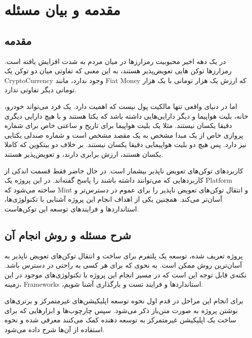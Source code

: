 
\chapter{مقدمه و بیان مسئله}

\section{مقدمه}
در یک دهه اخیر محبوبیت رمزارز‌ها در میان مردم به شدت افزایش یافته است.
رمزارزها توکن هایی تعویض‌پذیر هستند، به این معنی که تفاوتی میان دو توکن یک
\gls{CryptoCurrency}
وجود ندارد، مانند
\gls{Fiat Money}
که ارزش یک هزار تومانی با یک هزار تومانی دیگر تفاوتی ندارد.

اما در دنیای واقعی تنها مالکیت پول نیست که اهمیت دارد.
یک فرد می‌تواند خودرو، خانه، بلیت هواپیما و دیگر دارایی‌هایی داشته باشد که یکتا هستند و
با هیچ دارایی دیگری دقیقا یکسان نیستند.
مثلا یک بلیت هواپیما برای تاریخ و ساعتی خاص برای شماره پروازی خاص از یک مبدا مشخص به یک مقصد مشخص است و
شماره صندلی یکتایی نیز دارد.
پس هیچ دو بلیت هواپیمایی دقیقا یکسان نیستند.
بر خلاف دو بیتکوین که کاملا یکسان هستند، ارزش برابری دارند، و تعویض‌پذیر هستند.

کاربردهای توکن‌های تعویض ناپذیر بیشمار است.
در حال حاضر فقط قسمت اندکی از کاربردهایی که می‌توانند داشته باشند را پاسخ گفته‌اند.
در این پروژه یک
\gls{Platform}
ساخته می‌شود که
\gls{Mint}
و انتقال توکن‌های تعویض ناپذیر را برای عموم در دسترس‌تر و آسان‌تر می‌کند.
همچنین یکی از اهداف انجام این پروژه آشنایی با تکنولوژی‌ها، استاندارد‌ها و فرایند‌های توسعه این توکن‌هاست.


\section{شرح مسئله و روش انجام آن}
پروژه تعریف شده،
توسعه یک پلتفرم برای ساخت و انتقال توکن‌های تعویض ناپذیر به آسان‌ترین روش ممکن است.
به نحوی که برای هر کسی به راحتی در دسترس باشد.
نکته‌ی قابل توجه‌ این است که در مسیر انجام این پروژه با تکنولوژی‌های موجود در این زمینه، 
\glspl{Framework}
،استاندارد‌ها و فرایند تست و بارگذاری آشنا شویم.

برای انجام این مراحل در قدم اول نحوه توسعه اپلیکیشن‌های غیرمتمرکز و
برتری‌های نوشتن پروژه به صورت متن‌باز ذکر می‌شود.
سپس چارچوب‌ها و ابزار‌هایی که برای ساخت یک اپلیکیشن غیرمتمرکز به توسعه دهنده کمک می‌کنند معرفی شده
و نحوه استفاده از آن‌ها شرح داده می‌شود.

